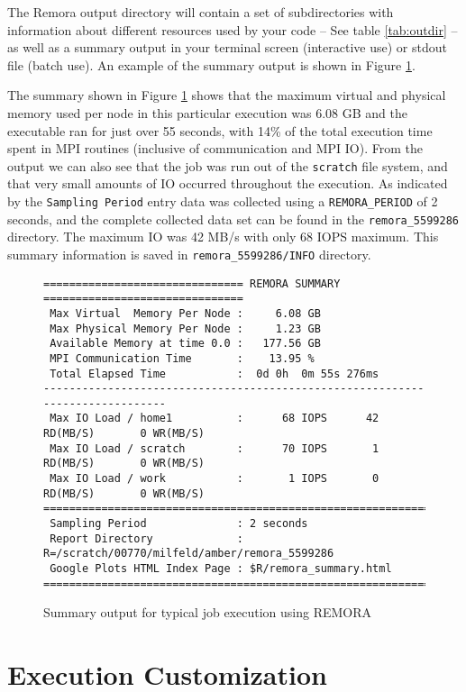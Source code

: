\documentclass[10pt,a4paper]{report}
\begin{document}
The Remora output directory will contain a set of subdirectories with information 
about different resources used by your code -- See table \ref{tab:outdir} -- 
as well as a summary output in your terminal screen (interactive use) or stdout file (batch use). 
An example of the summary output is shown in Figure \ref{fig:summary}.

The summary shown in Figure \ref{fig:summary} shows that the maximum 
virtual and physical memory 
used per node in this particular execution was 6.08 GB and the executable ran 
for just over 55 seconds, with 14\% of the total execution time spent in MPI 
routines (inclusive of communication and MPI IO). 
From the output we can also see that the job was run out of the \verb+scratch+ 
file system, and that very small amounts of IO occurred throughout the execution. 
As indicated by the \verb+Sampling Period+ entry data was collected using a 
\verb|REMORA_PERIOD| of 2 seconds, and the complete collected data set can be 
found in the \verb+remora_5599286+ directory. The maximum IO was 42 MB/s with
only 68 IOPS maximum.
This summary information is saved in \verb+remora_5599286/INFO+ directory.

\begin{figure}
\begin{verbatim}
=============================== REMORA SUMMARY ===============================
 Max Virtual  Memory Per Node :     6.08 GB
 Max Physical Memory Per Node :     1.23 GB
 Available Memory at time 0.0 :   177.56 GB
 MPI Communication Time       :    13.95 %
 Total Elapsed Time           :  0d 0h  0m 55s 276ms
------------------------------------------------------------------------------
 Max IO Load / home1          :      68 IOPS      42 RD(MB/S)       0 WR(MB/S)
 Max IO Load / scratch        :      70 IOPS       1 RD(MB/S)       0 WR(MB/S)
 Max IO Load / work           :       1 IOPS       0 RD(MB/S)       0 WR(MB/S)
==============================================================================
 Sampling Period              : 2 seconds
 Report Directory             : R=/scratch/00770/milfeld/amber/remora_5599286
 Google Plots HTML Index Page : $R/remora_summary.html
==============================================================================
\end{verbatim}
\caption{Summary output for typical job execution using REMORA}
\label{fig:summary}
\end{figure}

\FloatBarrier
\section{Execution Customization}\label{customize}
\end{document}
